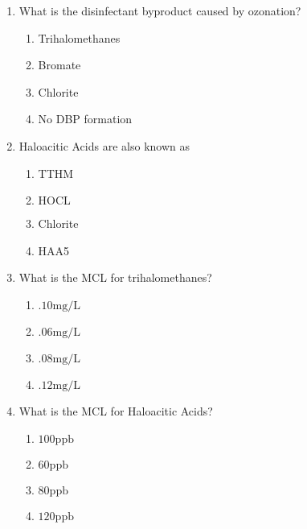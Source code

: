 \documentclass{article}
\begin{document}
\begin{enumerate}
\item  What is the disinfectant byproduct caused by ozonation?\\
\begin{enumerate}
\item Trihalomethanes\\
\item Bromate\\
\item Chlorite\\
\item No DBP formation
\end{enumerate}

\item  Haloacitic Acids are also known as\\
\begin{enumerate}
\item TTHM\\
\item $\mathrm{HOCL}$\\
\item Chlorite\\
\item HAA5
\end{enumerate}

\item  What is the MCL for trihalomethanes?\\
\begin{enumerate}
\item $.10 \mathrm{mg} / \mathrm{L}$\\
\item $.06 \mathrm{mg} / \mathrm{L}$\\
\item $.08 \mathrm{mg} / \mathrm{L}$\\
\item $.12 \mathrm{mg} / \mathrm{L}$
\end{enumerate}

\item  What is the MCL for Haloacitic Acids?\\
\begin{enumerate}
\item $100 \mathrm{ppb}$\\
\item $60 \mathrm{ppb}$\\
\item $80 \mathrm{ppb}$\\
\item $120 \mathrm{ppb}$
\end{enumerate}


\end{enumerate}
\end{document}
